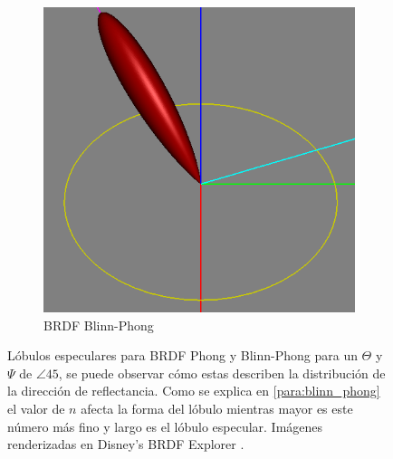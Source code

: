 \begin{figure}[H]
\begin{subfigure}[t]{0.3\textwidth}
		\captionsetup{justification=centering}
		\includegraphics[width=\linewidth]{media/blinnphong_lobule.png}
		\caption*{\ac{BRDF} Blinn-Phong}
	\end{subfigure}\hfill
	\caption{Lóbulos especulares para BRDF Phong y Blinn-Phong para un $\Theta$ y $\Psi$ de $\angle 45$, se puede observar cómo estas describen la distribución de la dirección de reflectancia. Como se explica en \ref{para:blinn_phong} el valor de $n$ afecta la forma del lóbulo mientras mayor es este número más fino y largo es el lóbulo especular. Imágenes renderizadas en Disney's BRDF Explorer \cite{brdf_explorer}.}
	\label{fig:brdf_lobules}
\end{figure}

